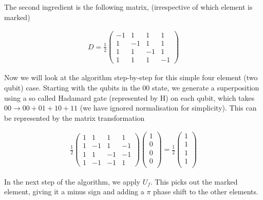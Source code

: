The second ingredient is the following matrix, (irrespective of which element is marked)

\begin{align}
        D = \frac{1}{2}\begin{pmatrix}
        -1 & 1 & 1 & 1 \\
                 1 & -1 & 1 & 1\\
                 1  & 1 & -1 & 1 \\
                 1 & 1 & 1 & -1
        \end{pmatrix}
\end{align}

Now we will look at the algorithm step-by-step for this simple four element (two qubit) case. Starting with the qubits in the 00 state, we generate a superposition using a so called Hadamard gate (represented by H) on each qubit, which takes $00 \rightarrow 00 + 01 + 10 +11$ (we have ignored normalisation for simplicity). This can be represented by the matrix transformation

\begin{align}
        \frac{1}{2}
        \begin{pmatrix}
        1 & 1 & 1 & 1 \\
        1 & -1 & 1 & -1\\
        1  & 1 & -1 & -1 \\
        1 & -1 & -1 & 1
        \end{pmatrix}
        \begin{pmatrix}
        1\\
        0\\
        0\\
        0\\
        \end{pmatrix}
        =
        \frac{1}{2}
        \begin{pmatrix}
        1\\
        1\\
        1\\
        1\\
        \end{pmatrix}
\end{align}

In the next step of the algorithm, we apply $U_f$. This picks out the marked element, giving it a minus sign and adding a $\pi$ phase shift to the other elements.

